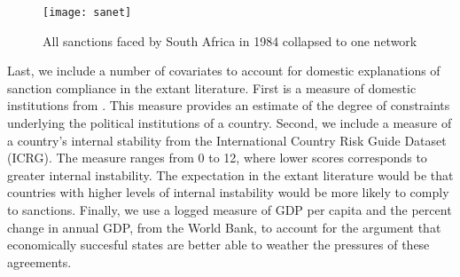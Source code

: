 \begin{figure}[ht]
	\centering
	\texttt{[image: sanet]}
	\caption{All sanctions faced by South Africa in 1984 collapsed to one network}
	\label{fig:sanet}
\end{figure}
\FloatBarrier

Last, we include a number of covariates to account for domestic explanations of sanction compliance in the extant literature. First is a measure of domestic institutions from \citet{henisz2000a}. This measure provides an estimate of the degree of constraints underlying the political institutions of a country. Second, we include a measure of a country's internal stability from the International Country Risk Guide Dataset (ICRG). The measure ranges from 0 to 12, where lower scores corresponds to greater internal instability. The expectation in the extant literature would be that countries with higher levels of internal instability would be more likely to comply to sanctions. Finally, we use a logged measure of GDP per capita and the percent change in annual GDP, from the World Bank, to account for the argument that economically succesful states are better able to weather the pressures of these agreements.

